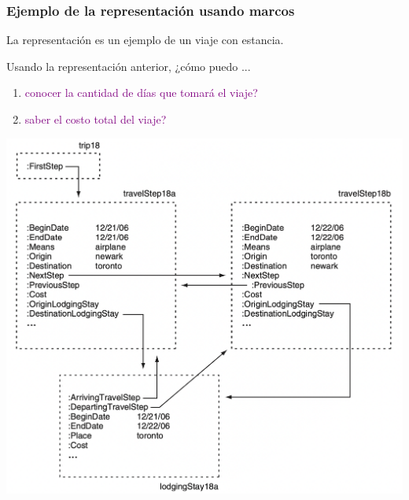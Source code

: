 \documentclass[
10pt, %
aspectratio=169, %
]{beamer}
\begin{document}
	\begin{frame}
		
		\frametitle{Ejemplo de la representación usando marcos}
		
		\begin{minipage}{.3\textwidth}
			
			La representación es un ejemplo de un viaje con estancia.
			
			\vspace{2\baselineskip}
			Usando la representación anterior, ¿cómo puedo ...
			\begin{enumerate}
				\item \textcolor{purple}{conocer la cantidad de días que tomará el viaje?}
				\item \textcolor{purple}{saber el costo total del viaje?}
			\end{enumerate}		
			
		\end{minipage}%
		\hfill
		\begin{minipage}{.6\textwidth}
			
			\centering
			
			\includegraphics[scale=0.32]{frame.png}
			
		\end{minipage}%
		
	\end{frame}
	
\end{document}
